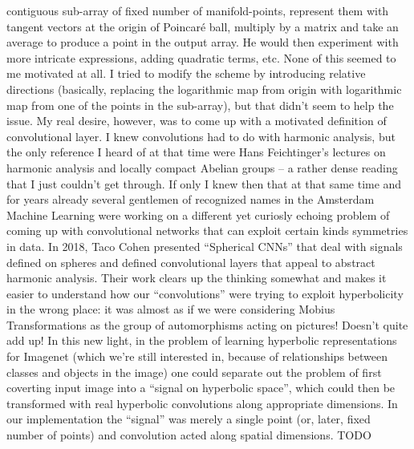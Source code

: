 contiguous sub-array of fixed number of manifold-points, represent them with
tangent vectors at the origin of Poincar\'e ball, multiply by a matrix and take
an average to produce a point in the output array. He would then experiment
with more intricate expressions, adding quadratic terms, etc. None of this seemed
to me motivated at all. I tried to modify the scheme by introducing relative
directions (basically, replacing the logarithmic map from origin with
logarithmic map from one of the points in the sub-array), but that didn't seem
to help the issue. My real desire, however, was to come up with a motivated
definition of convolutional layer. I knew convolutions had to do with harmonic analysis,
but the only reference I heard of at that time were Hans Feichtinger's lectures
on harmonic analysis and locally compact Abelian groups -- a rather dense
reading that I just couldn't get through. If only I knew then that at that same
time and for years already several gentlemen of recognized names in the
Amsterdam Machine Learning were working on a different yet curiosly echoing
problem of coming up with convolutional networks that can exploit certain kinds
symmetries in data. In 2018, Taco Cohen presented ``Spherical CNNs'' that deal
with signals defined on spheres and defined convolutional layers that appeal to
abstract harmonic analysis. Their work clears up the thinking somewhat and
makes it easier to understand how our ``convolutions'' were trying to exploit
hyperbolicity in the wrong place: it was almost as if we were considering
Mobius Transformations as the group of automorphisms acting on pictures!
Doesn't quite add up! In this new light, in the problem of learning hyperbolic
representations for Imagenet (which we're still interested in, because of
relationships between classes and objects in the image) one could separate out
the problem of first coverting input image into a ``signal on hyperbolic
space'', which could then be transformed with real hyperbolic convolutions
along appropriate dimensions. In our implementation the ``signal'' was merely a
single point (or, later, fixed number of points) and convolution acted along
spatial dimensions. TODO

